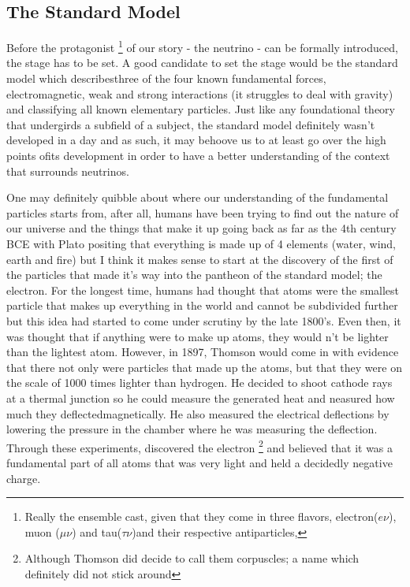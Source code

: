 \subsection{The Standard Model}

Before the protagonist
\footnote{Really the ensemble cast, given that they come in three flavors, electron($e\nu$), muon ($\mu \nu$) and tau($\tau \nu$)and their respective antiparticles,}
of our story - the neutrino - can be formally introduced, the stage has to be set.
A good candidate to set the stage would be the standard model which describesthree of the four known fundamental forces, electromagnetic, weak and strong interactions (it struggles to deal with  gravity) and classifying all known elementary particles.
Just like any foundational theory that undergirds a subfield of a subject, the standard model definitely wasn't developed in a day and as such, it may behoove us to at least go over the high points ofits development in order to have a better understanding of the context that surrounds neutrinos.

One may definitely quibble about where our understanding of the fundamental particles starts from, after all, humans have been trying to find out the nature of our universe and the things that make it up going back as far as the 4th century BCE with Plato positing that everything is made up of 4 elements (water, wind, earth and fire)\cite{Timaeus} but I think it makes sense to start at the discovery of the first of the particles that made it's way into the pantheon of the standard model; the electron.
For the longest time, humans had thought that atoms were the smallest particle that makes up everything in the world and cannot be subdivided further\cite{Dalton} but this idea had started to come under scrutiny by the late 1800's.
Even then, it was thought that if anything were to make up atoms, they would n't be lighter than the lightest atom.
However, in 1897, Thomson would come in with evidence that there not only were particles that made up the atoms, but that they were on the scale of 1000 times lighter  than hydrogen.
He decided to shoot cathode rays at a thermal junction so he could measure the generated heat and neasured how much they deflectedmagnetically.
He also measured the electrical deflections by lowering the pressure in the chamber where he was measuring the deflection.
Through these experiments, discovered the electron
\footnote{Although Thomson did decide to call them corpuscles; a name which definitely did not stick around}
and believed that it was a fundamental part of all atoms that was very light and held a decidedly negative charge.\cite{electronDiscovery}